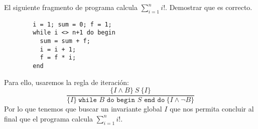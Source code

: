 \begin{ejercicio}
    El siguiente fragmento de programa calcula $\displaystyle\sum_{i=1}^{n} i!$. Demostrar que es correcto.
    \begin{verbatim}
        i = 1; sum = 0; f = 1;
        while i <> n+1 do begin
          sum = sum + f;
          i = i + 1;
          f = f * i;
        end
    \end{verbatim}
    Para ello, usaremos la regla de iteración:
    \begin{equation*}
        \dfrac{\{I \land B\}\ S\ \{I\}}{\{I\}\ \texttt{while\ } B \texttt{\ do\ begin\ } S \texttt{\ end\ do}\ \{I \land \lnot B\}}
    \end{equation*}
    Por lo que tenemos que buscar un invariante global $I$ que nos permita concluir al final que el programa calcula $\displaystyle\sum_{i=1}^{n} i!$.


\end{ejercicio}
